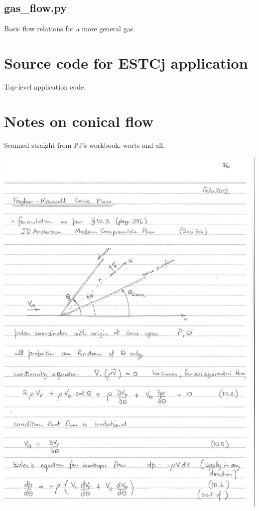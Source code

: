 \documentclass[landscape,12pt,a4paper]{article}
\begin{document}


\newpage
\subsection{gas\_flow.py}
\label{gas-flow-py}
%
Basic flow relations for a more general gas.



\newpage
\section{Source code for ESTCj application}
\label{estcj-py}
%
Top-level application code.



\newpage
\section{Notes on conical flow}
\label{pj-notes-cone-flow}
%
Scanned straight from PJ's workbook, warts and all.

\begin{center}
\includegraphics[width=0.9\textheight,angle=90]{../figs/pj-workbook-page-76.png}
\end{center}
\end{document}
